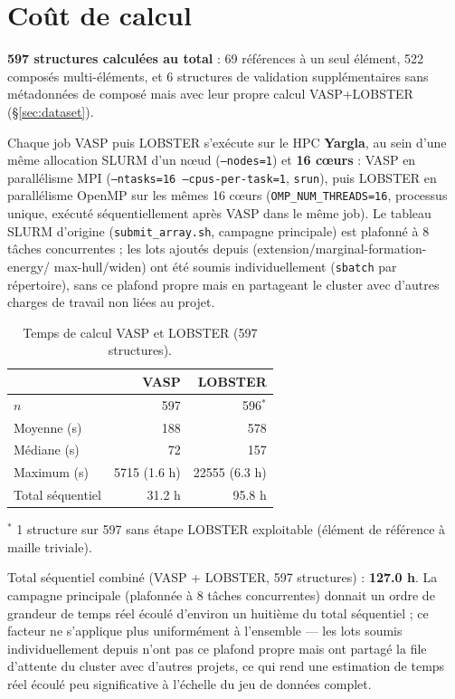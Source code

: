 \documentclass[11pt,a4paper]{article}
\begin{document}
\section{Coût de calcul}
\label{sec:cout}

\textbf{597 structures calculées au total} : 69 références à un seul
élément, 522 composés multi-éléments, et 6 structures de validation
supplémentaires sans métadonnées de composé mais avec leur propre calcul
VASP+LOBSTER (\S\ref{sec:dataset}).

Chaque job VASP puis LOBSTER s'exécute sur le HPC \textbf{Yargla}, au sein
d'une même allocation SLURM d'un n\oe ud (\texttt{--nodes=1}) et
\textbf{16 c\oe urs} : VASP en parallélisme MPI
(\texttt{--ntasks=16 --cpus-per-task=1}, \texttt{srun}), puis LOBSTER en
parallélisme OpenMP sur les mêmes 16 c\oe urs
(\texttt{OMP\_NUM\_THREADS=16}, processus unique, exécuté séquentiellement
après VASP dans le même job). Le tableau SLURM d'origine
(\texttt{submit\_array.sh}, campagne principale) est plafonné à 8 tâches
concurrentes ; les lots ajoutés depuis (extension/marginal-formation-energy/
max-hull/widen) ont été soumis individuellement (\texttt{sbatch} par
répertoire), sans ce plafond propre mais en partageant le cluster avec
d'autres charges de travail non liées au projet.

\begin{table}[htbp]
\centering
\caption{Temps de calcul VASP et LOBSTER (597 structures).}
\label{tab:compute-cost}
\begin{tabular}{@{}lrr@{}}
\toprule
 & VASP & LOBSTER \\
\midrule
$n$ & 597 & 596$^*$ \\
Moyenne (s) & 188 & 578 \\
Médiane (s) & 72 & 157 \\
Maximum (s) & 5715 (1.6 h) & 22555 (6.3 h) \\
Total séquentiel & 31.2 h & 95.8 h \\
\bottomrule
\end{tabular}

\vspace{0.15cm}
{\footnotesize $^*$ 1 structure sur 597 sans étape LOBSTER exploitable
(élément de référence à maille triviale).}
\end{table}

Total séquentiel combiné (VASP + LOBSTER, 597 structures) :
\textbf{127.0 h}. La campagne principale (plafonnée à 8 tâches
concurrentes) donnait un ordre de grandeur de temps réel écoulé
d'environ un huitième du total séquentiel ; ce facteur ne s'applique
plus uniformément à l'ensemble --- les lots soumis individuellement
depuis n'ont pas ce plafond propre mais ont partagé la file d'attente du
cluster avec d'autres projets, ce qui rend une estimation de temps réel
écoulé peu significative à l'échelle du jeu de données complet.
\end{document}
